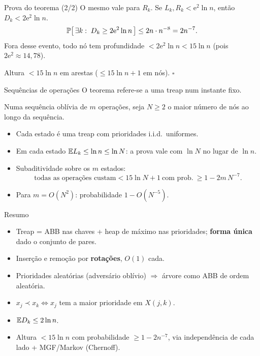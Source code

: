 \documentclass[aspectratio=169,11pt]{beamer}
\theoremstyle{definition}
\begin{document}
\begin{frame}{Prova do teorema (2/2)}
  O mesmo vale para $R_k$. Se $L_k,R_k<\mathrm e^2\ln n$, então
  $D_k<2\mathrm e^2\ln n$.
  \pause
  \[
    \ProbE{\exists k:\;D_k\ge2\mathrm e^2\ln n}
    \le 2n\cdot n^{-8}=2n^{-7}.
  \]
  \pause
  Fora desse evento, todo nó tem profundidade
  $<2\mathrm e^2\ln n<15\ln n$ (pois $2\mathrm e^2\approx14{,}78$).

  Altura $<15\ln n$ em arestas ($\le15\ln n+1$ em nós). \hfill $\square$
\end{frame}

\begin{frame}{Sequências de operações}
  O teorema refere-se a uma treap num instante fixo.

  \medskip
  Numa sequência oblívia de $m$ operações, seja $N\ge2$ o maior número
  de nós ao longo da sequência.
  \begin{itemize}
  \item Cada estado é uma treap com prioridades i.i.d.\ uniformes.
  \item Em cada estado $\mathbb{E}{L_k}\le\ln n\le\ln N$: a prova vale com
    $\ln N$ no lugar de $\ln n$.
  \item Subaditividade sobre os $m$ estados:
    \[
      \text{todas as operações custam}<15\ln N+1
      \ \text{com prob.}\ \ge1-2m\,N^{-7}.
    \]
  \item Para $m=O(N^2)$: probabilidade $1-O(N^{-5})$.
  \end{itemize}
\end{frame}

\begin{frame}{Resumo}
  \begin{itemize}
  \item Treap = ABB nas chaves + heap de máximo nas prioridades;
    \textbf{forma única} dado o conjunto de pares.
  \item Inserção e remoção por \textbf{rotações}, $O(1)$ cada.
  \item Prioridades aleatórias (adversário oblívio) $\Rightarrow$
    árvore como ABB de ordem aleatória.
  \item $x_j\prec x_k\iff x_j$ tem a maior prioridade em $X(j,k)$.
  \item $\mathbb{E}{D_k}\le2\ln n$.
  \item Altura $<15\ln n$ com probabilidade $\ge1-2n^{-7}$, via
    independência de cada lado + MGF/Markov (Chernoff).
  \end{itemize}
\end{frame}
\end{document}
